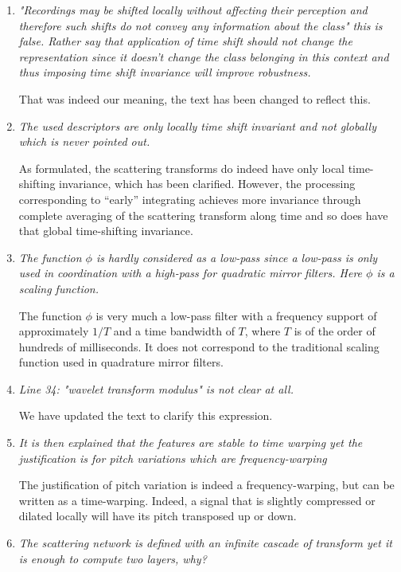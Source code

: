 \documentclass[10pt]{article}
\begin{document}
\begin{enumerate}
\item \emph{"Recordings may be shifted locally 
without affecting their perception and therefore such shifts do not convey any information about the class" this is false. Rather say that application of time shift should not change the representation since it doesn't change the class belonging in this context and thus imposing time shift invariance will improve robustness.}

That was indeed our meaning, the text has been changed to reflect this.

\item \emph{The used descriptors are only locally time shift invariant and not globally which is never pointed out.}

As formulated, the scattering transforms do indeed have only local time-shifting invariance, which has been clarified. However, the processing corresponding to ``early'' integrating achieves more invariance through complete averaging of the scattering transform along time and so does have that global time-shifting invariance.

\item \emph{The function $\phi$ is hardly considered as a low-pass since a low-pass is only used in coordination with a high-pass for quadratic mirror filters. Here $\phi$ is a scaling function.}

The function $\phi$ is very much a low-pass filter with a frequency support of approximately $1/T$ and a time bandwidth of $T$, where $T$ is of the order of hundreds of milliseconds. It does not correspond to the traditional scaling function used in quadrature mirror filters.

\item \emph{Line 34: "wavelet transform modulus" is not clear at all.}

We have updated the text to clarify this expression.

\item \emph{It is then explained that the features are stable to time warping yet the justification is for pitch variations which are frequency-warping}

The justification of pitch variation is indeed a frequency-warping, but can be written as a time-warping. Indeed, a signal that is slightly compressed or dilated locally will have its pitch transposed up or down.

\item \emph{The scattering network is defined with an infinite cascade of transform yet it is enough to compute two layers, why?}


\end{enumerate}
\end{document}
